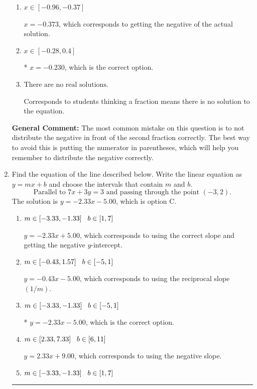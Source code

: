 \documentclass{extbook}[14pt]
\newcommand{\litem}[1]{\item #1

\rule{\textwidth}{0.4pt}}
\begin{document}
\begin{enumerate}
{\begin{enumerate}[label=\Alph*.]
$x = -2.328$, which corresponds to not distributing the negative in front of the first parentheses correctly.
\item \( x \in [-0.96, -0.37] \)

$x = -0.373$, which corresponds to getting the negative of the actual solution.
\item \( x \in [-0.28, 0.4] \)

* $x = -0.230$, which is the correct option.
\item \( \text{There are no real solutions.} \)

Corresponds to students thinking a fraction means there is no solution to the equation.
\end{enumerate}

\textbf{General Comment:} The most common mistake on this question is to not distribute the negative in front of the second fraction correctly. The best way to avoid this is putting the numerator in parentheses, which will help you remember to distribute the negative correctly.
}
\litem{
Find the equation of the line described below. Write the linear equation as $ y=mx+b $ and choose the intervals that contain $m$ and $b$.
\[ \text{Parallel to } 7 x + 3 y = 3 \text{ and passing through the point } (-3, 2). \]The solution is \( y = -2.33x - 5.00 \), which is option C.\begin{enumerate}[label=\Alph*.]
\item \( m \in [-3.33, -1.33] \hspace*{3mm} b \in [1, 7] \)

 $y = -2.33x + 5.00$, which corresponds to using the correct slope and getting the negative $y$-intercept.
\item \( m \in [-0.43, 1.57] \hspace*{3mm} b \in [-5, 1] \)

 $y = -0.43x - 5.00$, which corresponds to using the reciprocal slope $(1/m)$.
\item \( m \in [-3.33, -1.33] \hspace*{3mm} b \in [-5, 1] \)

* $y = -2.33x - 5.00$, which is the correct option.
\item \( m \in [2.33, 7.33] \hspace*{3mm} b \in [6, 11] \)

 $y = 2.33x + 9.00$, which corresponds to using the negative slope.
\item \( m \in [-3.33, -1.33] \hspace*{3mm} b \in [1, 7] \)


\end{enumerate}}
\end{enumerate}
\end{document}
